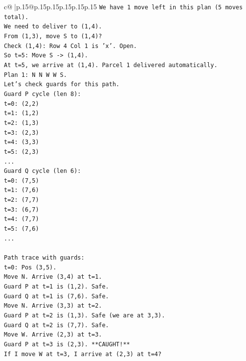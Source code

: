 \documentclass{article}
\begin{document}
{\begin{supertabular}{c@{$\;$}|p{.15\linewidth}@{}p{.15\linewidth}p{.15\linewidth}p{.15\linewidth}p{.15\linewidth}p{.15\linewidth}}
{{{\texttt{We have 1 move left in this plan (5 moves total).} \\
\texttt{We need to deliver to (1,4).} \\
\texttt{From (1,3), move S to (1,4)?} \\
\texttt{Check (1,4): Row 4 Col 1 is 'x'. Open.} \\
\texttt{So t=5: Move S {-}> (1,4).} \\
\texttt{At t=5, we arrive at (1,4). Parcel 1 delivered automatically.} \\
\texttt{Plan 1: N N W W S.} \\
\texttt{Let's check guards for this path.} \\
\texttt{Guard P cycle (len 8):} \\
\texttt{t=0: (2,2)} \\
\texttt{t=1: (1,2)} \\
\texttt{t=2: (1,3)} \\
\texttt{t=3: (2,3)} \\
\texttt{t=4: (3,3)} \\
\texttt{t=5: (2,3)} \\
\texttt{...} \\
\texttt{Guard Q cycle (len 6):} \\
\texttt{t=0: (7,5)} \\
\texttt{t=1: (7,6)} \\
\texttt{t=2: (7,7)} \\
\texttt{t=3: (6,7)} \\
\texttt{t=4: (7,7)} \\
\texttt{t=5: (7,6)} \\
\texttt{...} \\
\\ 
\texttt{Path trace with guards:} \\
\texttt{t=0: Pos (3,5).} \\
\texttt{Move N. Arrive (3,4) at t=1.} \\
\texttt{Guard P at t=1 is (1,2). Safe.} \\
\texttt{Guard Q at t=1 is (7,6). Safe.} \\
\texttt{Move N. Arrive (3,3) at t=2.} \\
\texttt{Guard P at t=2 is (1,3). Safe (we are at 3,3).} \\
\texttt{Guard Q at t=2 is (7,7). Safe.} \\
\texttt{Move W. Arrive (2,3) at t=3.} \\
\texttt{Guard P at t=3 is (2,3). **CAUGHT!**} \\
\texttt{If I move W at t=3, I arrive at (2,3) at t=4?} \\
}}}
\end{supertabular}}
\end{document}

